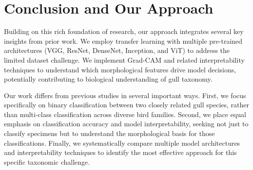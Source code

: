 \chapter*{Conclusion and Our Approach}

Building on this rich foundation of research, our approach integrates several key insights from prior work. We employ transfer learning with multiple pre-trained architectures (VGG, ResNet, DenseNet, Inception, and ViT) to address the limited dataset challenge. We implement Grad-CAM and related interpretability techniques to understand which morphological features drive model decisions, potentially contributing to biological understanding of gull taxonomy.


Our work differs from previous studies in several important ways. First, we focus specifically on binary classification between two closely related gull species, rather than multi-class classification across diverse bird families. Second, we place equal emphasis on classification accuracy and model interpretability, seeking not just to classify specimens but to understand the morphological basis for those classifications. Finally, we systematically compare multiple model architectures and interpretability techniques to identify the most effective approach for this specific taxonomic challenge.

